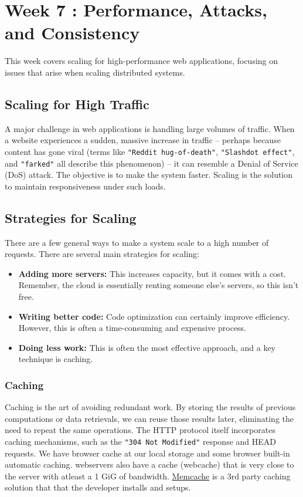 \section{Week 7 : Performance, Attacks, and Consistency}
This week covers scaling for high-performance web applications, focusing on issues that arise when scaling distributed systems.

\subsection{Scaling for High Traffic}
A major challenge in web applications is handling large volumes of traffic. When a website experiences a sudden, massive increase in traffic – perhaps because content has gone viral (terms like \texttt{"Reddit hug-of-death"}, \texttt{"Slashdot effect"}, and \texttt{"farked"} all describe this phenomenon) – it can resemble a Denial of Service (DoS) attack. The objective is to make the system faster. Scaling is the solution to maintain responsiveness under such loads.

\subsection{Strategies for Scaling}
There are a few general ways to make a system scale to a high number of requests.
There are several main strategies for scaling:

\begin{itemize}[topsep=4pt]
\item \textbf{Adding more servers:} This increases capacity, but it comes with a cost. Remember, the cloud is essentially renting someone else's servers, so this isn't free.
\item \textbf{Writing better code:} Code optimization can certainly improve efficiency. However, this is often a time-consuming and expensive process.
\item \textbf{Doing less work:} This is often the most effective approach, and a key technique is caching.
\end{itemize}

\subsubsection{Caching}
Caching is the art of avoiding redundant work. By storing the results of previous computations or data retrievals, we can reuse those results later, eliminating the need to repeat the same operations. The HTTP protocol itself incorporates caching mechanisms, such as the \texttt{"304 Not Modified"} response and HEAD requests.
We have browser cache at our local storage and some browser built-in automatic caching. webservers also have a cache (webcache) that is very close to the server with atleast a 1 GiG of bandwidth. \href{https://www.perplexity.ai/search/what-is-memcache-and-who-insta-elsmNvE8TgqhZgsP_K061Q}{Memcache} is a 3rd party caching solution that that the developer installs and setups.

